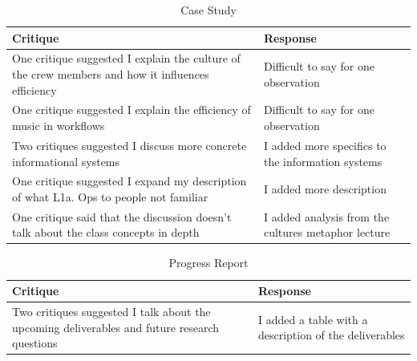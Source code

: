 \documentclass[letterpaper, 12pt]{report}
\begin{document}
\begin{table}[ht]
	\caption{Case Study}
	\begin{tabular}{p{8cm} p{8cm}}
		\hline \hline
		Critique & Response\\
		\hline
		One critique suggested I explain the culture of the crew members and how it influences efficiency & Difficult to say for one observation\\
		One critique suggested I explain the efficiency of music in workflows & Difficult to say for one observation\\
		Two critiques suggested I discuss more concrete informational systems & I added more specifics to the information systems\\
		One critique suggested I expand my description of what L1a. Ops to people not familiar & I added more description\\
		One critique said that the discussion doesn't talk about the class concepts in depth & I added analysis from the cultures metaphor lecture\\
		\hline
	\end{tabular}
\end{table}

\begin{table}[ht]
	\caption{Progress Report}
	\begin{tabular}{p{8cm} p{8cm}}
		\hline \hline
		Critique & Response\\
		\hline
		Two critiques suggested I talk about the upcoming deliverables and future research questions& I added a table with a description of the deliverables\\
		\hline
	\end{tabular}
\end{table}
\end{document}

